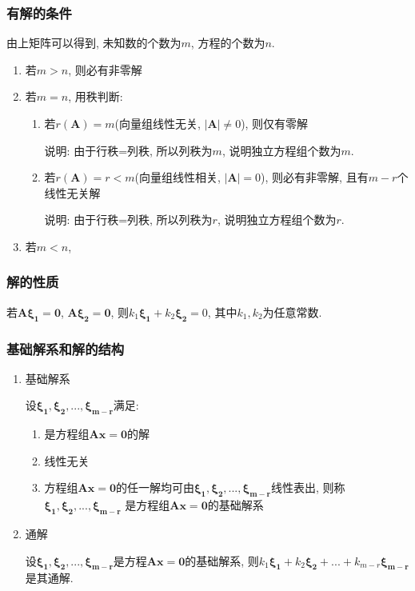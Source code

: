\subsubsection{有解的条件}
由上矩阵可以得到, 未知数的个数为$ m $, 方程的个数为$ n $.
\begin{enumerate}
\item 若$ m>n $, 则必有非零解
\item 若$ m=n $, 用秩判断:
\begin{enumerate}
\item 若$ r(\bm{A})=m $(向量组线性无关, $ |\bm{A}|\neq 0 $), 则仅有零解 \par
说明: 由于行秩=列秩, 所以列秩为$ m $, 说明独立方程组个数为$ m $.
\item 若$ r(\bm{A})=r<m $(向量组线性相关, $ |\bm{A}| = 0 $), 则必有非零解, 且有$ m-r $个线性无关解 \par
说明: 由于行秩=列秩, 所以列秩为$ r $, 说明独立方程组个数为$ r $.
\end{enumerate}
\item 若$ m<n $,
\end{enumerate}
\subsubsection{解的性质}
若$ \bm{A}\bm{\xi_{1}}=\bm{0} $, $ \bm{A}\bm{\xi_{2}}=\bm{0} $, 则$ k_{1}\bm{\xi_{1}}+k_{2}\bm{\xi_{2}}=0 $, 其中$ k_{1},k_{2} $为任意常数.
\subsubsection{基础解系和解的结构}
\begin{enumerate}
\item 基础解系\par
设$ \bm{\xi_{1}},\bm{\xi_{2}},...,\bm{\xi_{m-r}} $满足:
\begin{enumerate}
\item 是方程组$ \bm{A}\bm{x}=\bm{0} $的解
\item 线性无关
\item 方程组$ \bm{A}\bm{x}=\bm{0} $的任一解均可由$ \bm{\xi_{1}},\bm{\xi_{2}},...,\bm{\xi_{m-r}} $线性表出, 则称$ \bm{\xi_{1}},\bm{\xi_{2}},...,\bm{\xi_{m-r}} $ 是方程组$ \bm{A}\bm{x}=\bm{0} $的基础解系
\end{enumerate}
\item 通解\par
设$ \bm{\xi_{1}},\bm{\xi_{2}},...,\bm{\xi_{m-r}} $是方程$ \bm{A}\bm{x}=\bm{0} $的基础解系, 则$ k_{1}\bm{\xi_{1}}+k_{2}\bm{\xi_{2}}+...+k_{m-r}\bm{\xi_{m-r}} $是其通解.
\end{enumerate}
